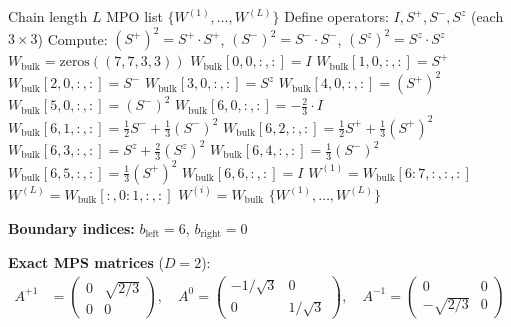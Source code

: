 \documentclass[aps,prb,onecolumn,scriptaddress]{revtex4-2}
\begin{document}
	\begin{algorithm}[H]
		\caption{BuildAKLTMPO}
		\begin{algorithmic}[1]
			\Require Chain length $L$
			\Ensure MPO list $\{W^{(1)}, \ldots, W^{(L)}\}$
			\State Define operators: $I, S^+, S^-, S^z$ (each $3 \times 3$)
			\State Compute: $(S^+)^2 = S^+ \cdot S^+$, $(S^-)^2 = S^- \cdot S^-$, $(S^z)^2 = S^z \cdot S^z$
			\State {}
			\State $W_{\text{bulk}} = \text{zeros}((7, 7, 3, 3))$
			\State $W_{\text{bulk}}[0, 0, :, :] = I$
			\State $W_{\text{bulk}}[1, 0, :, :] = S^+$
			\State $W_{\text{bulk}}[2, 0, :, :] = S^-$
			\State $W_{\text{bulk}}[3, 0, :, :] = S^z$
			\State $W_{\text{bulk}}[4, 0, :, :] = (S^+)^2$
			\State $W_{\text{bulk}}[5, 0, :, :] = (S^-)^2$
			\State $W_{\text{bulk}}[6, 0, :, :] = -\frac{2}{3} \cdot I$ 
			\State $W_{\text{bulk}}[6, 1, :, :] = \frac{1}{2} S^- + \frac{1}{3}(S^-)^2$
			\State $W_{\text{bulk}}[6, 2, :, :] = \frac{1}{2} S^+ + \frac{1}{3}(S^+)^2$
			\State $W_{\text{bulk}}[6, 3, :, :] = S^z + \frac{2}{3}(S^z)^2$
			\State $W_{\text{bulk}}[6, 4, :, :] = \frac{1}{3}(S^-)^2$
			\State $W_{\text{bulk}}[6, 5, :, :] = \frac{1}{3}(S^+)^2$
			\State $W_{\text{bulk}}[6, 6, :, :] = I$
			\State {}
			\State $W^{(1)} = W_{\text{bulk}}[6:7, :, :, :]$ 
			\State $W^{(L)} = W_{\text{bulk}}[:, 0:1, :, :]$ 
			\State $W^{(i)} = W_{\text{bulk}}$ 
			\EndFor
			\State \Return $\{W^{(1)}, \ldots, W^{(L)}\}$
			\end{algorithmic}
		\end{algorithm}
	
	\textbf{Boundary indices:} $b_{\text{left}} = 6$, $b_{\text{right}} = 0$
	
	\textbf{Exact MPS matrices} ($D = 2$):
	\begin{align}
		A^{+1} &= \begin{pmatrix} 0 & \sqrt{2/3} \\ 0 & 0 \end{pmatrix}, \quad
		A^{0} = \begin{pmatrix} -1/\sqrt{3} & 0 \\ 0 & 1/\sqrt{3} \end{pmatrix}, \quad
		A^{-1} = \begin{pmatrix} 0 & 0 \\ -\sqrt{2/3} & 0 \end{pmatrix}
	\end{align}
	
\end{document}

